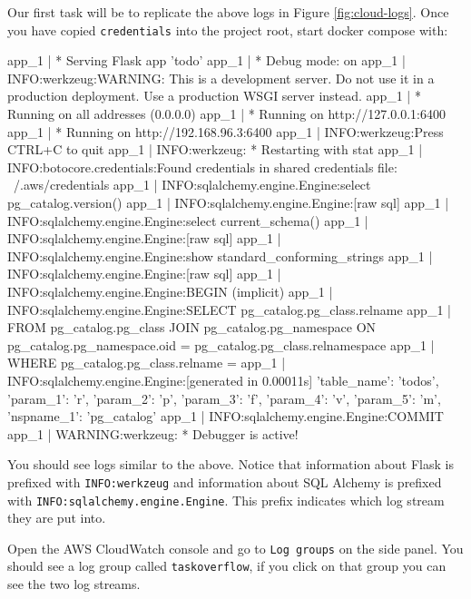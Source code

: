\documentclass{csse4400}
\begin{document}
Our first task will be to replicate the above logs in Figure \ref{fig:cloud-logs}.
Once you have copied \texttt{credentials} into the project root,
start docker compose with:

\begin{code}[numbers=none]{}
app_1       |  * Serving Flask app 'todo'
app_1       |  * Debug mode: on
app_1       | INFO:werkzeug:WARNING: This is a development server. Do not use it in a production deployment. Use a production WSGI server instead.
app_1       |  * Running on all addresses (0.0.0.0)
app_1       |  * Running on http://127.0.0.1:6400
app_1       |  * Running on http://192.168.96.3:6400
app_1       | INFO:werkzeug:Press CTRL+C to quit
app_1       | INFO:werkzeug: * Restarting with stat
app_1       | INFO:botocore.credentials:Found credentials in shared credentials file: ~/.aws/credentials
app_1       | INFO:sqlalchemy.engine.Engine:select pg_catalog.version()
app_1       | INFO:sqlalchemy.engine.Engine:[raw sql] {}
app_1       | INFO:sqlalchemy.engine.Engine:select current_schema()
app_1       | INFO:sqlalchemy.engine.Engine:[raw sql] {}
app_1       | INFO:sqlalchemy.engine.Engine:show standard_conforming_strings
app_1       | INFO:sqlalchemy.engine.Engine:[raw sql] {}
app_1       | INFO:sqlalchemy.engine.Engine:BEGIN (implicit)
app_1       | INFO:sqlalchemy.engine.Engine:SELECT pg_catalog.pg_class.relname
app_1       | FROM pg_catalog.pg_class JOIN pg_catalog.pg_namespace ON pg_catalog.pg_namespace.oid = pg_catalog.pg_class.relnamespace
app_1       | WHERE pg_catalog.pg_class.relname = %
app_1       | INFO:sqlalchemy.engine.Engine:[generated in 0.00011s] {'table_name': 'todos', 'param_1': 'r', 'param_2': 'p', 'param_3': 'f', 'param_4': 'v', 'param_5': 'm', 'nspname_1': 'pg_catalog'}
app_1       | INFO:sqlalchemy.engine.Engine:COMMIT
app_1       | WARNING:werkzeug: * Debugger is active!
\end{code}

You should see logs similar to the above.
Notice that information about Flask is prefixed with \texttt{INFO:werkzeug} and information about SQL Alchemy is prefixed with \texttt{INFO:sqlalchemy.engine.Engine}.
This prefix indicates which log stream they are put into.

Open the AWS CloudWatch console and go to \texttt{Log groups} on the side panel.
You should see a log group called \texttt{taskoverflow},
if you click on that group you can see the two log streams.
\end{document}
